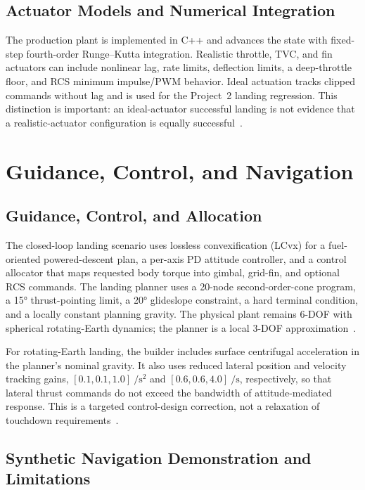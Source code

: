 \documentclass[11pt,letterpaper]{article}
\begin{document}
\subsection{Actuator Models and Numerical Integration}

The production plant is implemented in C++ and advances the state with fixed-step fourth-order Runge--Kutta integration. Realistic throttle, TVC, and fin actuators can include nonlinear lag, rate limits, deflection limits, a deep-throttle floor, and RCS minimum impulse/PWM behavior. Ideal actuation tracks clipped commands without lag and is used for the Project~2 landing regression. This distinction is important: an ideal-actuator successful landing is not evidence that a realistic-actuator configuration is equally successful~\cite{readme,physics_report}.

\section{Guidance, Control, and Navigation}\label{sec:gnc}

\subsection{Guidance, Control, and Allocation}

The closed-loop landing scenario uses lossless convexification (LCvx) for a fuel-oriented powered-descent plan, a per-axis PD attitude controller, and a control allocator that maps requested body torque into gimbal, grid-fin, and optional RCS commands. The landing planner uses a 20-node second-order-cone program, a \ang{15} thrust-pointing limit, a \ang{20} glideslope constraint, a hard terminal condition, and a locally constant planning gravity. The physical plant remains 6-DOF with spherical rotating-Earth dynamics; the planner is a local 3-DOF approximation~\cite{architecture,configs}.

For rotating-Earth landing, the builder includes surface centrifugal acceleration in the planner's nominal gravity. It also uses reduced lateral position and velocity tracking gains, $[0.1,0.1,1.0]~\si{\per\second\squared}$ and $[0.6,0.6,4.0]~\si{\per\second}$, respectively, so that lateral thrust commands do not exceed the bandwidth of attitude-mediated response. This is a targeted control-design correction, not a relaxation of touchdown requirements~\cite{physics_report}.

\subsection{Synthetic Navigation Demonstration and Limitations}
\end{document}
